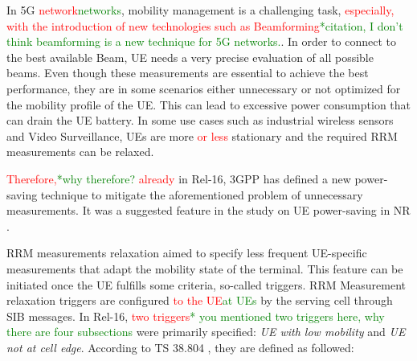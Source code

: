 \documentclass[]{IEEEtran}
\newcommand{\CAREPL}[2]{\textcolor{red}{#1}\textcolor{green}{#2}}
\begin{document}
In 5G \CAREPL{network}{networks}, mobility management is a challenging task, \CAREPL{especially, with the introduction of new technologies such as Beamforming}{*citation, I don't think beamforming is a new technique for 5G networks.}. 
In order to connect to the best available Beam, UE needs a very precise evaluation of all possible beams. 
Even though these measurements are essential to achieve the best performance, they are in some scenarios either unnecessary or not optimized for the mobility profile of the UE. 
This can lead to excessive power consumption that can drain the UE battery. 
In some use cases such as industrial wireless sensors and Video Surveillance, UEs are more \CAREPL{or less}{} stationary and the required RRM measurements can be relaxed.

\CAREPL{Therefore,}{*why therefore?} \CAREPL{already}{} in Rel-16, 3GPP has defined a new power-saving technique to mitigate the aforementioned problem of unnecessary measurements. It was a suggested feature in the study on UE power-saving in NR \cite{3gpp_study_2019_38.840}.

 RRM measurements relaxation aimed to specify less frequent UE-specific measurements that adapt the mobility state of the terminal. 
 This feature can be initiated once the UE fulfills some criteria, so-called triggers. 
 RRM Measurement relaxation triggers are configured \CAREPL{to the UE}{at UEs} by the serving cell through SIB messages. 
 In Rel-16, \CAREPL{two triggers}{* you mentioned two triggers here, why there are four subsections} were primarily specified: \textit{UE with low mobility} and \textit{UE not at cell edge}. According to TS 38.804 \cite{3gpp_study_nodate-4_38.804}, they are defined as followed:\\

\end{document}
